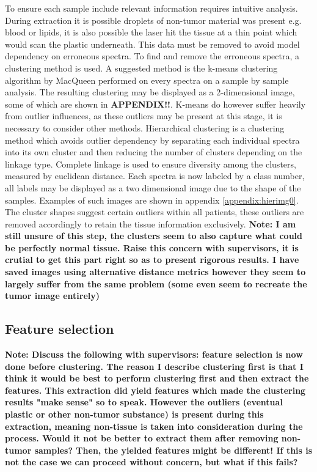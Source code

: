 To ensure each sample include relevant information requires intuitive analysis. During extraction it is possible droplets of non-tumor material was present e.g. blood or lipids, it is also possible the laser hit the tissue at a thin point which would scan the plastic underneath. This data must be removed to avoid model dependency on erroneous spectra. To find and remove the erroneous spectra, a clustering method is used. A suggested method is the k-means clustering algorithm by MacQueen \cite{macqueen} performed on every spectra on a sample by sample analysis. The resulting clustering may be displayed as a 2-dimensional image, some of which are shown in \textbf{APPENDIX!!}. K-means do however suffer heavily from outlier influences, as these outliers may be present at this stage, it is necessary to consider other methods. Hierarchical clustering is a clustering method which avoids outlier dependency by separating each individual spectra into its own cluster and then reducing the number of clusters depending on the linkage type. Complete linkage is used to ensure diversity among the clusters, measured by euclidean distance\cite{scikit}. Each spectra is now labeled by a class number, all labels may be displayed as a two dimensional image due to the shape of the samples. Examples of such images are shown in appendix \ref{appendix:hierimg0}. The cluster shapes suggest certain outliers within all patients, these outliers are removed accordingly to retain the tissue information exclusively. \textbf{Note: I am still unsure of this step, the clusters seem to also capture what could be perfectly normal tissue. Raise this concern with supervisors, it is crutial to get this part right so as to present rigorous results. I have saved images using alternative distance metrics however they seem to largely suffer from the same problem (some even seem to recreate the tumor image entirely)}

\subsection{Feature selection}

\textbf{Note: Discuss the following with supervisors: feature selection is now done before clustering. The reason I describe clustering first is that I think it would be best to perform clustering first and then extract the features. This extraction did yield features which made the clustering results "make sense" so to speak. However the outliers (eventual plastic or other non-tumor substance) is present during this extraction, meaning non-tissue is taken into consideration during the process. Would it not be better to extract them after removing non-tumor samples? Then, the yielded features might be different! If this is not the case we can proceed without concern, but what if this fails?}
\\

